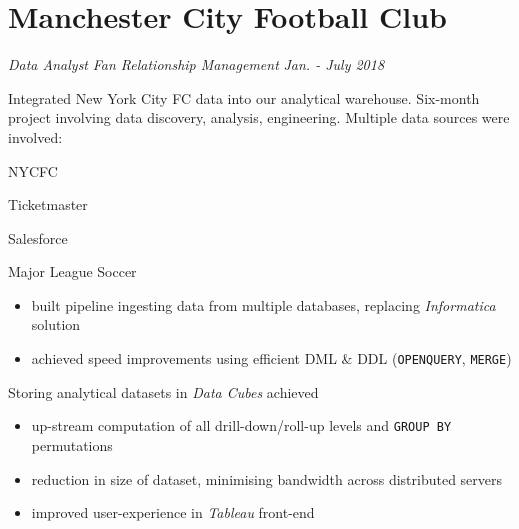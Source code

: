 \documentclass[letterpaper,11pt]{article}
\begin{document}
\newpage
\section{Manchester City Football Club}
\textit{Data Analyst}
\hfill
\textit{Fan Relationship Management}
\hfill
\textit{Jan. - July 2018}

\begin{description}[style=multiline,leftmargin=3cm]
	\item[NYCFC Data Integration \textnormal{Project Owner}]

	      Integrated New York City FC  data into our analytical warehouse.
	      Six-month project involving data discovery, analysis, engineering.
	      Multiple data sources were involved:
	      \begin{itemize*}
		      \item NYCFC
		      \item Ticketmaster
		      \item Salesforce
		      \item Major League Soccer
	      \end{itemize*}
	      \begin{description}[style=multiline,leftmargin=2.5cm]
		      \item[Data Pipeline]
		            {
		            \begin{itemize}
			            \item built pipeline ingesting data from multiple databases, replacing \textit{Informatica} solution
			            \item achieved speed improvements using efficient DML \& DDL (\texttt{OPENQUERY}, \texttt{MERGE})
		            \end{itemize}
		            }

		      \item[Data Cubes]
		            Storing analytical datasets in \textit{Data Cubes} achieved
		            \begin{itemize}
			            \item up-stream computation of all drill-down/roll-up levels and \texttt{GROUP BY} permutations
			            \item reduction in size of dataset, minimising bandwidth across distributed servers
			            \item improved user-experience in \textit{Tableau} front-end
		            \end{itemize}


\end{description}
\end{description}
\end{document}
